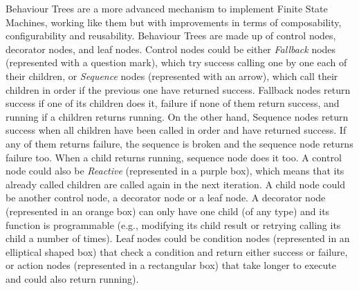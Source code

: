 
Behaviour Trees are a more advanced mechanism to implement Finite State Machines, working like them but with improvements in terms of composability, configurability and reusability. Behaviour Trees are made up of control nodes, decorator nodes, and leaf nodes. Control nodes could be either \textit{Fallback} nodes (represented with a question mark), which try success calling one by one each of their children, or \textit{Sequence} nodes (represented with an arrow), which call their children in order if the previous one have returned success. Fallback nodes return success if one of its children does it, failure if none of them return success, and running if a children returns running. On the other hand, Sequence nodes return success when all children have been called in order and have returned success. If any of them returns failure, the sequence is broken and the sequence node returns failure too. When a child returns running, sequence node does it too. A control node could also be \textit{Reactive} (represented in a purple box), which means that its already called children are called again in the next iteration. A child node could be another control node, a decorator node or a leaf node. A decorator node (represented in an orange box) can only have one child (of any type) and its function is programmable (e.g., modifying its child result or retrying calling its child a number of times). Leaf nodes could be condition nodes (represented in an elliptical shaped box) that check a condition and return either success or failure, or action nodes (represented in a rectangular box) that take longer to execute and could also return running).


